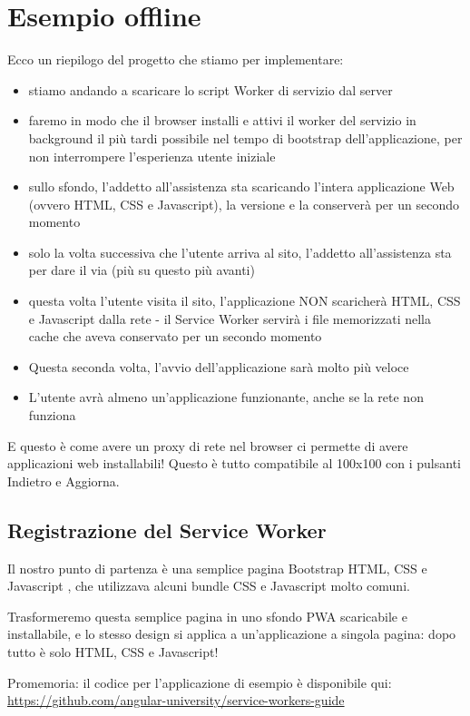 \documentclass[italian]{article}
\begin{document}
\section{Esempio offline}
Ecco un riepilogo del progetto che stiamo per implementare:
\begin{itemize}
\item stiamo andando a scaricare lo script Worker di servizio dal server
\item faremo in modo che il browser installi e attivi il worker del servizio in background il più tardi possibile nel tempo di bootstrap dell'applicazione, per non interrompere l'esperienza utente iniziale
\item sullo sfondo, l'addetto all'assistenza sta scaricando l'intera applicazione Web (ovvero HTML, CSS e Javascript), la versione e la conserverà per un secondo momento
\item solo la volta successiva che l'utente arriva al sito, l'addetto all'assistenza sta per dare il via (più su questo più avanti)
\item questa volta l'utente visita il sito, l'applicazione NON scaricherà HTML, CSS e Javascript dalla rete - il Service Worker servirà i file memorizzati nella cache che aveva conservato per un secondo momento
\item Questa seconda volta, l'avvio dell'applicazione sarà molto più veloce
\item L'utente avrà almeno un'applicazione funzionante, anche se la rete non funziona
\end{itemize}
E questo è come avere un proxy di rete nel browser ci permette di avere applicazioni web installabili! Questo è tutto compatibile al 100x100 con i pulsanti Indietro e Aggiorna.


\subsection{Registrazione del Service Worker}
Il nostro punto di partenza è una semplice pagina Bootstrap HTML, CSS e Javascript , che utilizzava alcuni bundle CSS e Javascript molto comuni.

Trasformeremo questa semplice pagina in uno sfondo PWA scaricabile e installabile, e lo stesso design si applica a un'applicazione a singola pagina: dopo tutto è solo HTML, CSS e Javascript!

Promemoria: il codice per l'applicazione di esempio è disponibile qui: \url{https://github.com/angular-university/service-workers-guide}
\end{document}
